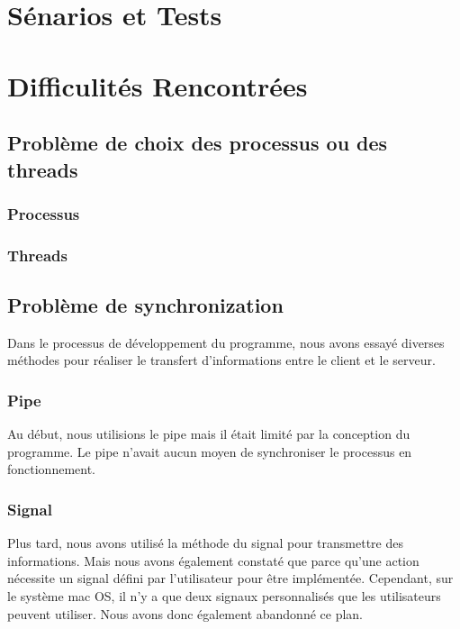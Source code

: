 \documentclass[14px]{article}
\begin{document}
\section{Sénarios et Tests}

\section{Difficulités Rencontrées}
\subsection{Problème de choix des processus ou des threads}
\subsubsection{Processus}

\subsubsection{Threads}

\subsection{Problème de synchronization}
Dans le processus de développement du programme, nous avons essayé diverses méthodes pour réaliser le transfert d'informations entre le client et le serveur.
\subsubsection{Pipe}
Au début, nous utilisions le pipe mais il était limité par la conception du programme. Le pipe n'avait aucun moyen de synchroniser le processus en fonctionnement.
\subsubsection{Signal}
Plus tard, nous avons utilisé la méthode du signal pour transmettre des informations. Mais nous avons également constaté que parce qu'une action nécessite un signal défini par l'utilisateur pour être implémentée. Cependant, sur le système mac OS, il n'y a que deux signaux personnalisés que les utilisateurs peuvent utiliser. Nous avons donc également abandonné ce plan.
\end{document}
